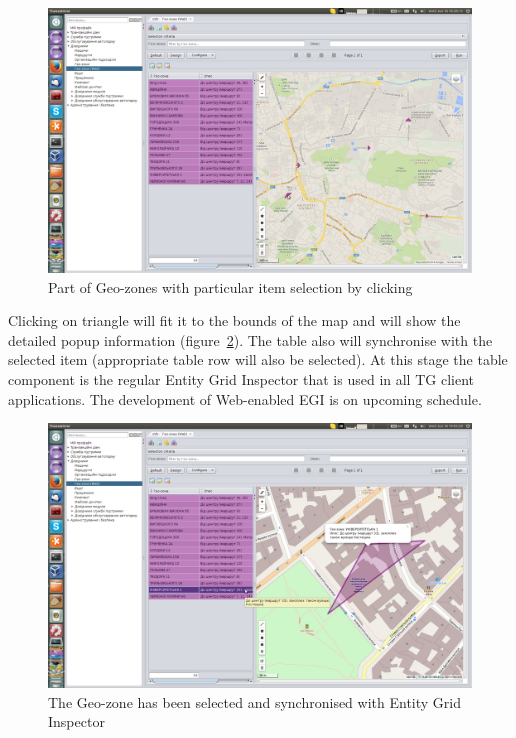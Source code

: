 \begin{figure}[H]
\centering
\includegraphics[width=\linewidth]{chapters/01-geozones/images/03-part-of-geo-zones-with-particular-item-selection-by-clicking.png}
\caption{Part of Geo-zones with particular item selection by clicking}\label{fig:03}
\end{figure}

\newpage
Clicking on triangle will fit it to the bounds of the map and will show the detailed popup information (figure~\ref{fig:04}). The table also will synchronise with the selected item (appropriate table row will also be selected). At this stage the table component is the regular Entity Grid Inspector that is used in all TG client applications. The development of Web-enabled EGI is on upcoming schedule.

\begin{figure}[H]
\centering
\includegraphics[width=\linewidth]{chapters/01-geozones/images/04-selected-geo-zone-and-synchronised-with-grid.png}
\caption{The Geo-zone has been selected and synchronised with Entity Grid Inspector}\label{fig:04}
\end{figure}

